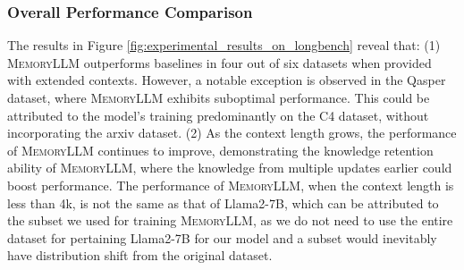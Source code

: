 \documentclass{article}
\theoremstyle{plain}
\theoremstyle{definition}
\theoremstyle{remark}
\newcommand{\ours}{\textsc{MemoryLLM}\xspace}
\newcommand{\wy}[1]{{\color{black}{#1}}}
\begin{document}
\subsubsection{Overall Performance Comparison}
The results in Figure \ref{fig:experimental_results_on_longbench} reveal that: 
(1) \ours outperforms baselines in four out of six datasets when provided with extended contexts. However, a notable exception is observed in the Qasper dataset, where \ours exhibits suboptimal performance. This could be attributed to the model's training predominantly on the C4 dataset, without incorporating the arxiv dataset. \wy{Thus, the training may affect the model’s ability on scientific datasets (such as Qasper).} 
(2) As the context length grows, the performance of \ours continues to improve, demonstrating the knowledge retention ability of \ours, where the knowledge from multiple updates earlier could boost performance. 
The performance of \ours, when the context length is less than 4k, is not the same as that of Llama2-7B, which can be attributed to the subset we used for training \ours, as we do not need to use the entire dataset for pertaining Llama2-7B for our model and a subset would inevitably have distribution shift from the original dataset. 
\end{document}
